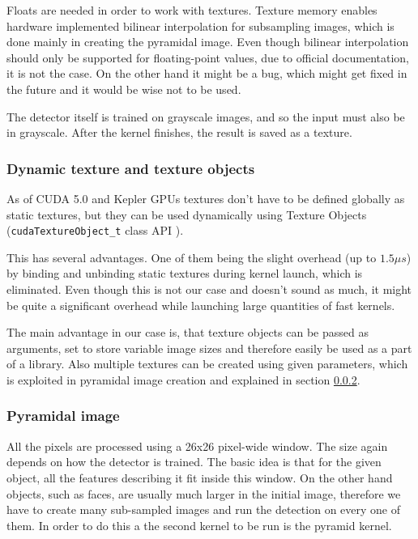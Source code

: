 Floats are needed in order to work with textures. Texture memory enables hardware implemented bilinear interpolation for subsampling images, which is done mainly in creating the pyramidal image. Even though bilinear interpolation should only be supported for floating-point values, due to official documentation, it is not the case. On the other hand it might be a bug, which might get fixed in the future and it would be wise not to be used.

The detector itself is trained on grayscale images, and so the input must also be in grayscale. After the kernel finishes, the result is saved as a texture.

\subsubsection{Dynamic texture and texture objects}\label{subsubsec:dynamic-texture}

As of CUDA 5.0 and Kepler GPUs textures don't have to be defined globally as static textures, but they can be used dynamically using Texture Objects (\verb|cudaTextureObject_t| class API \cite{cuda-texture-obj}).

This has several advantages. One of them being the slight overhead (up to $1.5 \mu s$) by binding and unbinding static textures during kernel launch, which is eliminated. Even though this is not our case and doesn't sound as much, it might be quite a significant overhead while launching large quantities of fast kernels.

The main advantage in our case is, that texture objects can be passed as arguments, set to store variable image sizes and therefore easily be used as a part of a library. Also multiple textures can be created using given parameters, which is exploited in pyramidal image creation and explained in section \ref{subsubsec:pyramidal}.

\subsubsection{Pyramidal image}\label{subsubsec:pyramidal}

All the pixels are processed using a 26x26 pixel-wide window. The size again depends on how the detector is trained. The basic idea is that for the given object, all the features describing it fit inside this window. On the other hand objects, such as faces, are usually much larger in the initial image, therefore we have to create many sub-sampled images and run the detection on every one of them. In order to do this a the second kernel to be run is the pyramid kernel.

